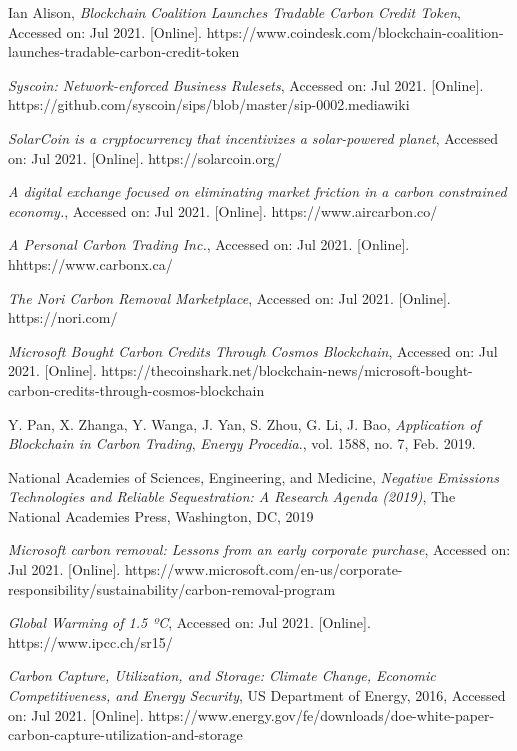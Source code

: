 \documentclass{article}
\begin{document}
\begin{thebibliography}{1}

 Ian Alison, \textit{Blockchain Coalition Launches Tradable Carbon Credit Token}, Accessed on: Jul 2021. [Online]. https://www.coindesk.com/blockchain-coalition-launches-tradable-carbon-credit-token

 \textit{Syscoin: Network-enforced Business Rulesets}, Accessed on: Jul 2021. [Online]. https://github.com/syscoin/sips/blob/master/sip-0002.mediawiki

 \textit{SolarCoin is a cryptocurrency that incentivizes a solar-powered planet}, Accessed on: Jul 2021. [Online]. https://solarcoin.org/


 \textit{A digital exchange focused on eliminating market friction in a carbon constrained economy.}, Accessed on: Jul 2021. [Online]. https://www.aircarbon.co/

 \textit{A Personal Carbon Trading Inc.}, Accessed on: Jul 2021. [Online]. hhttps://www.carbonx.ca/

 \textit{The Nori Carbon Removal Marketplace}, Accessed on: Jul 2021. [Online]. https://nori.com/

 \textit{Microsoft Bought Carbon Credits Through Cosmos Blockchain}, Accessed on: Jul 2021. [Online]. https://thecoinshark.net/blockchain-news/microsoft-bought-carbon-credits-through-cosmos-blockchain

 Y. Pan, X. Zhanga, Y. Wanga, J. Yan, S. Zhou, G. Li, J. Bao, \textit{Application of Blockchain in Carbon Trading}, \emph{Energy Procedia}., vol. 1588, no. 7, Feb. 2019.

 National Academies of Sciences, Engineering, and Medicine, \textit{Negative Emissions Technologies and Reliable Sequestration: A Research Agenda (2019)}, The National Academies Press, Washington, DC, 2019 

  \textit{Microsoft carbon removal: Lessons from an early corporate purchase}, Accessed on: Jul 2021. [Online]. https://www.microsoft.com/en-us/corporate-responsibility/sustainability/carbon-removal-program

 \textit{Global Warming of 1.5 ºC}, Accessed on: Jul 2021. [Online]. https://www.ipcc.ch/sr15/

 \textit{Carbon Capture, Utilization, and Storage: Climate Change, Economic Competitiveness, and Energy Security}, US Department of Energy, 2016, Accessed on: Jul 2021. [Online]. https://www.energy.gov/fe/downloads/doe-white-paper-carbon-capture-utilization-and-storage


\end{thebibliography}
\end{document}
